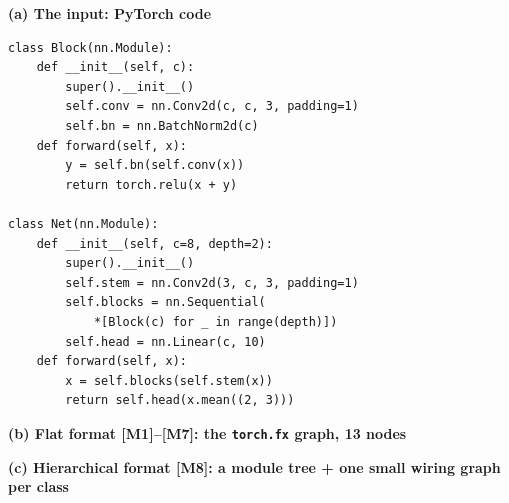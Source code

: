 \documentclass[10pt]{article}
\newcommand{\tg}[1]{\textcolor{tagc}{\textbf{[#1]}}}
\newcommand{\demofont}{\fontsize{5.6}{6.3}\selectfont\ttfamily}
\begin{document}
\noindent\begin{minipage}{\textwidth}
\noindent\begin{minipage}[t]{0.335\textwidth}
{\footnotesize\textbf{(a) The input: PyTorch code}}\par\vspace{2pt}
\begin{lstlisting}
class Block(nn.Module):
    def __init__(self, c):
        super().__init__()
        self.conv = nn.Conv2d(c, c, 3, padding=1)
        self.bn = nn.BatchNorm2d(c)
    def forward(self, x):
        y = self.bn(self.conv(x))
        return torch.relu(x + y)

class Net(nn.Module):
    def __init__(self, c=8, depth=2):
        super().__init__()
        self.stem = nn.Conv2d(3, c, 3, padding=1)
        self.blocks = nn.Sequential(
            *[Block(c) for _ in range(depth)])
        self.head = nn.Linear(c, 10)
    def forward(self, x):
        x = self.blocks(self.stem(x))
        return self.head(x.mean((2, 3)))
\end{lstlisting}
\end{minipage}\hfill
\begin{minipage}[t]{0.645\textwidth}
{\footnotesize\textbf{(b) Flat format \tg{M1}--\tg{M7}: the \texttt{torch.fx} graph, 13 nodes}}\par\vspace{3pt}
\par\vspace{1pt}
{\footnotesize\textbf{(c) Hierarchical format \tg{M8}: a module tree + one small wiring graph per class}}\par\vspace{2pt}

\end{minipage}
\end{minipage}
\end{document}
